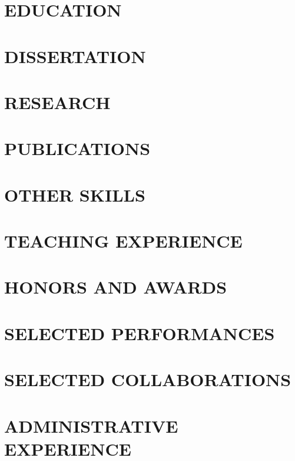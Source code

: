 \documentclass[overlapped]{res}
\begin{document}
\begin{resume}

\section{EDUCATION}


\section{DISSERTATION}



\section{RESEARCH}


\section{PUBLICATIONS}


\section{OTHER SKILLS}


\section{TEACHING EXPERIENCE}


\section{HONORS AND AWARDS}


\section{SELECTED PERFORMANCES}


\section{SELECTED COLLABORATIONS}


\section{ADMINISTRATIVE EXPERIENCE}


\end{resume}
\end{document}
